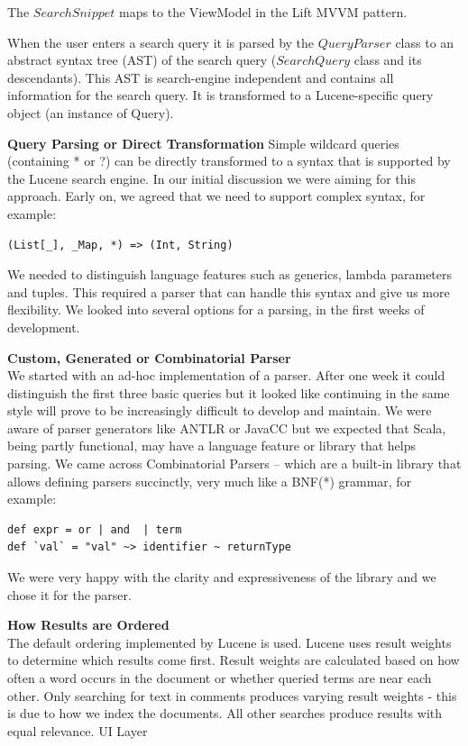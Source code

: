 The $SearchSnippet$ maps to the ViewModel in the Lift MVVM pattern.

When the user enters a search query it is parsed by the $QueryParser$ class to an abstract syntax tree (AST) of the search query ($SearchQuery$ class and its descendants). This AST is search-engine independent and contains all information for the search query. It is transformed to a Lucene-specific query object (an instance of Query).

\textbf{Query Parsing or Direct Transformation} 
Simple wildcard queries (containing * or ?) can be directly transformed to a syntax that is supported by the Lucene search engine. In our initial discussion we were aiming for this approach. Early on, we agreed that we need to support complex syntax, for example:

\begin{lstlisting}
(List[_], _Map, *) => (Int, String)
\end{lstlisting}

We needed to distinguish language features such as generics, lambda parameters and tuples. This required a parser that can handle this syntax and give us more flexibility. We looked into several options for a parsing, in the first weeks of development. 

\textbf{Custom, Generated or Combinatorial Parser}\\
We started with an ad-hoc implementation of a parser. After one week it could distinguish the first three basic queries but it looked like continuing in the same style will prove to be increasingly difficult to develop and maintain. We were aware of parser generators like ANTLR or JavaCC but we expected that Scala, being partly functional, may have a language feature or library that helps parsing. We came across Combinatorial Parsers – which are a built-in library that allows defining parsers succinctly, very much like a BNF(*) grammar, for example:

\begin{lstlisting}
def expr = or | and  | term
def `val` = "val" ~> identifier ~ returnType
\end{lstlisting}
We were very happy with the clarity and expressiveness of the library and we chose it for the parser.

\textbf{How Results are Ordered}\\ 
The default ordering implemented by Lucene is used. Lucene uses result weights to determine which results come first. Result weights are calculated based on how often a word occurs in the document or whether queried terms are near each other. Only searching for text in comments produces varying result weights - this is due to how we index the documents. All other searches produce results with equal relevance.
UI Layer 

